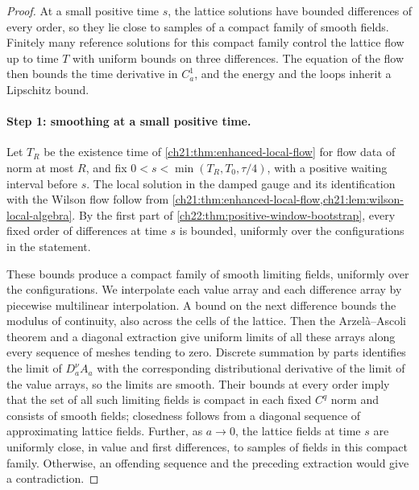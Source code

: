 \begin{proof}
At a small positive time $s$, the lattice solutions have bounded differences of every order, so they lie close to samples of a compact family of smooth fields. Finitely many reference solutions for this compact family control the lattice flow up to time $T$ with uniform bounds on three differences. The equation of the flow then bounds the time derivative in $C_a^1$, and the energy and the loops inherit a Lipschitz bound.

\paragraph{Step 1: smoothing at a small positive time.}
Let $T_R$ be the existence time of \cref{ch21:thm:enhanced-local-flow} for flow data of norm at most $R$, and fix $0<s<\min(T_R,T_0,\tau/4)$, with a positive waiting interval before $s$. The local solution in the damped gauge and its identification with the Wilson flow follow from \cref{ch21:thm:enhanced-local-flow,ch21:lem:wilson-local-algebra}. By the first part of \cref{ch22:thm:positive-window-bootstrap}, every fixed order of differences at time $s$ is bounded, uniformly over the configurations in the statement.

These bounds produce a compact family of smooth limiting fields, uniformly over the configurations. We interpolate each value array and each difference array by piecewise multilinear interpolation. A bound on the next difference bounds the modulus of continuity, also across the cells of the lattice. Then the Arzel\`a--Ascoli theorem and a diagonal extraction give uniform limits of all these arrays along every sequence of meshes tending to zero. Discrete summation by parts identifies the limit of $D_a^\nu A_a$ with the corresponding distributional derivative of the limit of the value arrays, so the limits are smooth. Their bounds at every order imply that the set of all such limiting fields is compact in each fixed $C^q$ norm and consists of smooth fields; closedness follows from a diagonal sequence of approximating lattice fields. Further, as $a\to0$, the lattice fields at time $s$ are uniformly close, in value and first differences, to samples of fields in this compact family. Otherwise, an offending sequence and the preceding extraction would give a contradiction.


\end{proof}
